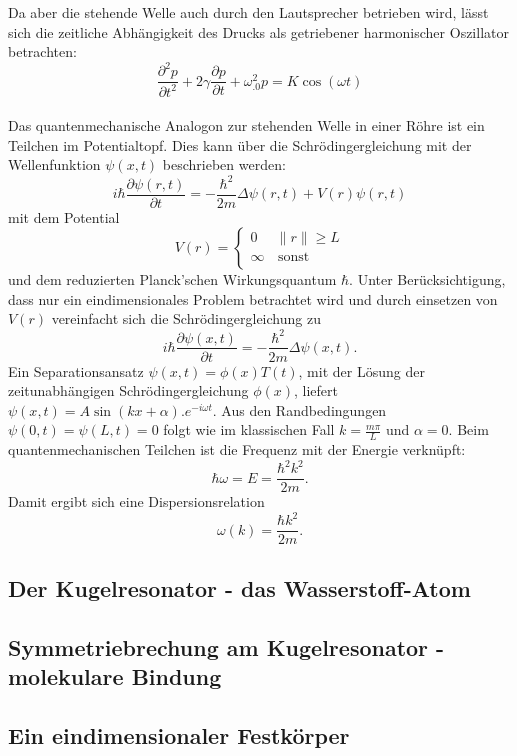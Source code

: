 Da aber die stehende Welle auch durch den Lautsprecher betrieben wird, lässt sich die zeitliche Abhängigkeit des Drucks als getriebener harmonischer Oszillator betrachten:
\[
\frac{\partial^2p}{\partial t^2}+2\gamma\frac{\partial p}{\partial t}+\omega_.0^2p=K\cos{(\omega t)}
\]
\\
\newline
Das quantenmechanische Analogon zur stehenden Welle in einer Röhre ist ein Teilchen im Potentialtopf.
Dies kann über die Schrödingergleichung mit der Wellenfunktion $\psi(x,t)$ beschrieben werden:
\[
i\hbar\frac{\partial\psi(r,t)}{\partial t}=-\frac{\hbar^2}{2m}\Delta\psi(r,t) + V(r)\psi(r,t)
\]
mit dem Potential 
\[
V(r) = \left\{
\begin{array}{ll}
0 & \|r\| \geq L \\
\infty & \, \textrm{sonst} \\
\end{array}
\right.
\]
und dem reduzierten Planck'schen Wirkungsquantum $\hbar$.
Unter Berücksichtigung, dass nur ein eindimensionales Problem betrachtet wird und durch einsetzen von $V(r)$ vereinfacht sich die Schrödingergleichung zu
\[
i\hbar\frac{\partial\psi(x,t)}{\partial t}=-\frac{\hbar^2}{2m}\Delta\psi(x,t)\text{.}
\]
Ein Separationsansatz $\psi(x,t)=\phi(x)T(t)$, mit der Lösung der zeitunabhängigen Schrödingergleichung $\phi(x)$, liefert
$\psi(x,t)=A\sin(kx+\alpha) .e^{-i\omega t}$. Aus den Randbedingungen 
$\psi(0,t)=\psi(L,t)=0$ folgt wie im klassischen Fall $k=\frac{m\pi}{L}$ und $\alpha=0$.
Beim quantenmechanischen Teilchen ist die Frequenz mit der Energie verknüpft:
\[
\hbar\omega=E=\frac{\hbar^2k^2}{2m}\text{.}
\]
Damit ergibt sich eine Dispersionsrelation
\begin{equation}
\omega(k)=\frac{\hbar k^2}{2m}\text{.}\label{eq:omega_q}
\end{equation}
\subsection{Der Kugelresonator - das Wasserstoff-Atom}


\subsection{Symmetriebrechung am Kugelresonator - molekulare Bindung}


\subsection{Ein eindimensionaler Festkörper}



